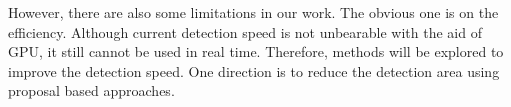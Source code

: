\documentclass[twocolumn]{svjour3}
\begin{document}
However, there are also some limitations in our work. The obvious one is on the efficiency. Although current detection speed is not unbearable with the aid of GPU, it still cannot be used in real time. Therefore, methods will be explored to improve the detection speed. One direction is to reduce the detection area using proposal based approaches. 
 



%
%






%
%
\end{document}
